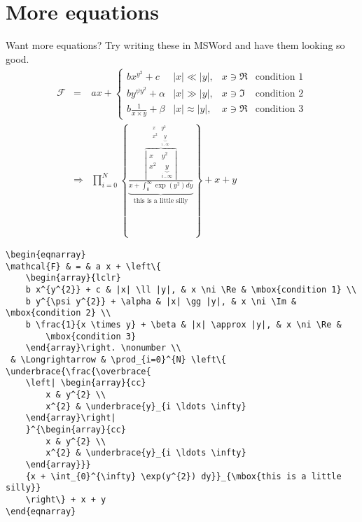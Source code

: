 \documentclass[12pt, a4paper]{book}
\begin{document}
\section*{More equations}
Want more equations?  Try writing these in MSWord and have them looking so good.
\begin{eqnarray}
\mathcal{F} & = & a x + \left\{
\begin{array}{lclr}
b x^{y^{2}} + c & |x| \ll |y|, & x \ni \Re & \mbox{condition 1} \\
b y^{\psi y^{2}} + \alpha & |x| \gg |y|, & x \ni \Im & \mbox{condition 2} \\
b \frac{1}{x \times y} + \beta & |x| \approx |y|, & x \ni \Re & \mbox{condition 3}
\end{array} \right. \nonumber \\
 & \Longrightarrow & \prod_{i=0}^{N} \left\{ \underbrace{\frac{\overbrace{\left|\begin{array}{cc}x & y^{2} \\ x^{2} & \underbrace{y}_{i \ldots \infty}\end{array}\right|}^{\begin{array}{cc}x & y^{2} \\ x^{2} & \underbrace{y}_{i \ldots \infty} \end{array}}}{x + \int_{0}^{\infty} \exp(y^{2}) dy}}_{\mbox{this is a little silly}} \right\} + x + y
\end{eqnarray}

\begin{verbatim}
\begin{eqnarray}
\mathcal{F} & = & a x + \left\{
    \begin{array}{lclr}
    b x^{y^{2}} + c & |x| \ll |y|, & x \ni \Re & \mbox{condition 1} \\
    b y^{\psi y^{2}} + \alpha & |x| \gg |y|, & x \ni \Im & \mbox{condition 2} \\
    b \frac{1}{x \times y} + \beta & |x| \approx |y|, & x \ni \Re & 
        \mbox{condition 3}
    \end{array}\right. \nonumber \\
 & \Longrightarrow & \prod_{i=0}^{N} \left\{ \underbrace{\frac{\overbrace{
    \left| \begin{array}{cc}
        x & y^{2} \\ 
        x^{2} & \underbrace{y}_{i \ldots \infty}
    \end{array}\right|
    }^{\begin{array}{cc}
        x & y^{2} \\
        x^{2} & \underbrace{y}_{i \ldots \infty}
    \end{array}}}
    {x + \int_{0}^{\infty} \exp(y^{2}) dy}}_{\mbox{this is a little silly}}
    \right\} + x + y
\end{eqnarray}
\end{verbatim}
\end{document}
